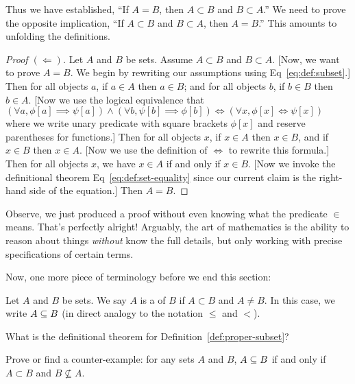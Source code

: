 Thus we have established, ``If $A=B$, then $A\subset B$ and $B\subset A$.''
We need to prove the opposite implication, ``If $A\subset B$ and
$B\subset A$, then $A=B$.'' This amounts to unfolding the definitions.

\begin{proof}[Proof $(\Longleftarrow)$]
Let $A$ and $B$ be sets. Assume $A\subset B$ and $B\subset A$. [Now, we
want to prove $A=B$. We begin by rewriting our assumptions using
Eq~\eqref{eq:def:subset}.] Then for all objects $a$, if $a\in A$ then
$a\in B$; and for all objects $b$, if $b\in B$ then $b\in A$. [Now we
use the logical equivalence that $(\forall a,\phi[a]\implies\psi[a])\land(\forall b,\psi[b]\implies\phi[b])\iff(\forall x,\phi[x]\iff\psi[x])$
where we write unary predicate with square brackets $\phi[x]$ and
reserve parentheses for functions.] Then for all objects $x$, if $x\in A$ then
$x\in B$, and if $x\in B$ then $x\in A$. [Now we use the definition of
$\iff$ to rewrite this formula.] Then for all objects $x$, we have $x\in A$
if and only if $x\in B$. [Now we invoke the definitional theorem Eq~\ref{eq:def:set-equality}
since our current claim is the right-hand side of the equation.]
Then $A=B$.
\end{proof}

\begin{remark}
Observe, we just produced a proof without even knowing what the
predicate $\in$ means. That's perfectly alright! Arguably, the art of
mathematics is the ability to reason about things \emph{without} know
the full details, but only working with precise specifications of
certain terms.
\end{remark}

Now, one more piece of terminology before we end this section:
\begin{definition}\label{def:proper-subset}
Let $A$ and $B$ be sets. We say $A$ is a  of $B$
if $A\subset B$ and $A\neq B$. In this case, we write $A\propersubset B$
(in direct analogy to the notation $\leq$ and $<$).
\end{definition}

\begin{xca}\label{xca:subsets:def-thm-for-proper-subset}
What is the definitional theorem for Definition~\ref{def:proper-subset}?
\end{xca}

\begin{xca}\label{xca:proper-subsets-in-terms-of-improper-subsets}
Prove or find a counter-example: for any sets $A$ and $B$,
$A\propersubset B$ if and only if $A\subset B$ and $B\nsubseteq A$.
\end{xca}

